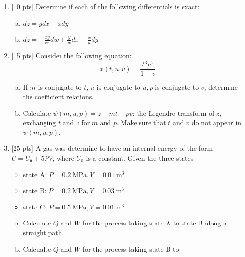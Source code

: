 
\DeclareSIUnit{}





\pagebreak

\begin{enumerate}
  \item {[10 pts]} Determine if each of the following
    differentials is exact:

    \begin{enumerate}[(a)]
      \item $dz = ydx - xdy$
      \item $dz = -\frac{xy}{w^2}dw + \frac{y}{w} dx + \frac{x}{w}dy$
    \end{enumerate}
  \item {[15 pts]} Consider the following equation:
    \begin{equation*}
      x(t, u, v) = \frac{t^3 u^2}{1 - v}
    \end{equation*}
    \begin{enumerate}[(a)]
      \item If $m$ is conjugate to $t$, $n$ is conjugate to $u, p$ is
        conjugate to $v$, determine the coefficient relations.
      \item Calculate $\psi(m, u, p) = z - mt - pv$: the Legendre
        transform of $z$, exchanging $t$ and $v$ for $m$ and $p$.
        Make sure that $t$ and $v$ do not appear in $\psi(m, u, p)$.
    \end{enumerate}
  \item {[25 pts]} A gas was determine to have an internal energy of
    the form $U = U_0 + 5PV$, where $U_0$ is a constant. Given the
    three states
    \begin{itemize}[\textbullet]
      \item state A: $P = \SI{0.2}{\mega\pascal},  V =
        \SI{0.01}{\meter\cubed}$
      \item state B: $P = \SI{0.2}{\mega\pascal}, V = \SI{0.03}{\meter\cubed}$
      \item state C: $P = \SI{0.5}{\mega\pascal}, V = \SI{0.01}{\meter\cubed}$
    \end{itemize}
    \begin{enumerate}[(a)]
      \item Calculate $Q$ and $W$ for the process taking state A to
        state B along a straight path
      \item Calcualte $Q$ and $W$ for the process taking state B to

\end{enumerate}
\end{enumerate}
